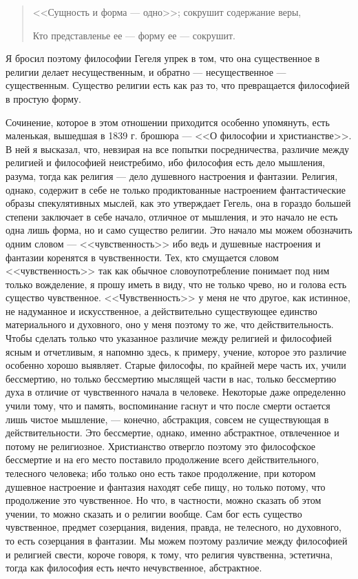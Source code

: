 \documentclass[12pt]{article}
\begin{document}
\begin{quote}

<<Сущность и форма --- одно>>; сокрушит содержание веры, 

Кто представленье ее --- форму ее --- сокрушит. 

\end{quote}
Я бросил поэтому философии Гегеля упрек в том, что она существенное в религии делает несущественным, и обратно --- несущественное --- существенным. Существо религии есть как раз то, что превращается философией в простую форму. 

Сочинение, которое в этом отношении приходится особенно упомянуть, есть маленькая, вышедшая в 1839 г. брошюра --- <<О философии и христианстве>>. В ней я высказал, что, невзирая на все попытки посредничества, различие между религией и философией неистребимо, ибо философия есть дело мышления, разума, тогда как религия --- дело душевного настроения и фантазии. Религия, однако, содержит в себе не только продиктованные настроением фантастические образы спекулятивных мыслей, как это утверждает Гегель, она в гораздо большей степени заключает в себе начало, отличное от мышления, и это начало не есть одна лишь форма, но и само существо религии. Это начало мы можем обозначить одним словом --- <<чувственность>>  ибо ведь и душевные настроения и фантазии коренятся в чувственности. Тех, кто смущается словом <<чувственность>>  так как обычное словоупотребление понимает под ним только вожделение, я прошу иметь в виду, что не только чрево, но и голова есть существо чувственное. <<Чувственность>> у меня не что другое, как истинное, не надуманное и искусственное, а действительно существующее единство материального и духовного, оно у меня поэтому то же, что действительность. Чтобы сделать только что указанное различие между религией и философией ясным и отчетливым, я напомню здесь, к примеру, учение, которое это различие особенно хорошо выявляет. Старые философы, по крайней мере часть их, учили бессмертию, но только бессмертию мыслящей части в нас, только бессмертию духа в отличие от чувственного начала в человеке. Некоторые даже определенно учили тому, что и память, воспоминание гаснут и что после смерти остается лишь чистое мышление, --- конечно, абстракция, совсем не существующая в действительности. Это бессмертие, однако, именно абстрактное, отвлеченное и потому не религиозное. Христианство отвергло поэтому это философское бессмертие и на его место поставило продолжение всего действительного, телесного человека; ибо только оно есть такое продолжение, при котором душевное настроение и фантазия находят себе пищу, но только потому, что продолжение это чувственное. Но что, в частности, можно сказать об этом учении, то можно сказать и о религии вообще. Сам бог есть существо чувственное, предмет созерцания, видения, правда, не телесного, но духовного, то есть созерцания в фантазии. Мы можем поэтому различие между философией и религией свести, короче говоря, к тому, что религия чувственна, эстетична, тогда как философия есть нечто нечувственное, абстрактное. 
\end{document}
